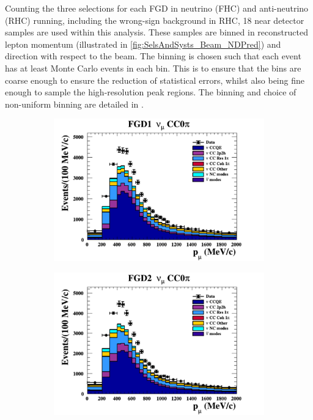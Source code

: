 Counting the three selections for each FGD in neutrino (FHC) and anti-neutrino (RHC) running, including the wrong-sign background in RHC, 18 near detector samples are used within this analysis. These samples are binned in reconstructed lepton momentum (illustrated in \autoref{fig:SelsAndSysts_Beam_NDPred}) and direction with respect to the beam. The binning is chosen such that each event has at least  Monte Carlo events in each bin. This is to ensure that the bins are coarse enough to ensure the reduction of statistical errors, whilst also being fine enough to sample the high-resolution peak regions. The binning and choice of non-uniform binning are detailed in \cite{thesis_will}.

\begin{figure}[h]
  \begin{subfigure}[t]{0.49\textwidth}
    \includegraphics[width=\textwidth, trim={0mm 0mm 0mm 0mm}, clip,page=1]{Figures/Selections/Pmu_1D_modes_FGD1_numuCC_0pi_Data_prefit.pdf}
  \end{subfigure}%
  \begin{subfigure}[t]{0.49\textwidth}
    \includegraphics[width=\textwidth, trim={0mm 0mm 0mm 0mm}, clip,page=1]{Figures/Selections/Pmu_1D_modes_FGD2_numuCC_0pi_Data_prefit.pdf}

\end{subfigure}
\end{figure}
